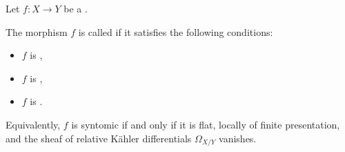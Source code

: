 \begin{definition} \label{definition:syntomic_morphism_of_schemes}
    Let $f: X \to Y$ be a .

    The morphism $f$ is called  if it satisfies the following conditions:
    \begin{itemize}
        \item $f$ is ,
        \item $f$ is ,
        \item $f$ is .
    \end{itemize}

    Equivalently, $f$ is syntomic if and only if it is flat, locally of finite presentation, and the sheaf of relative Kähler differentials $\Omega_{X/Y}$ vanishes.
\end{definition}

